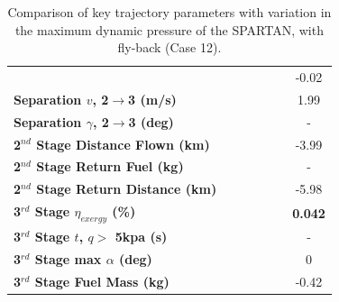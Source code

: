 \begin{table}[ht]
\begin{tabular}{l c c c c c c}
		& \secondthirdSeparationAltqForty
		& \secondthirdSeparationAltqFortyFive
		& \secondthirdSeparationAltqStandard
		& \secondthirdSeparationAltqFiftyFive
		& \secondthirdSeparationAltqSixty
		&-0.02
		\\
		\textbf{Separation $v$, 2$\rightarrow$3 (m/s)}
		& \secondthirdSeparationvqForty
		& \secondthirdSeparationvqFortyFive
		& \secondthirdSeparationvqStandard
		& \secondthirdSeparationvqFiftyFive
		& \secondthirdSeparationvqSixty
		&1.99
		\\
		\textbf{Separation $\gamma$, 2$\rightarrow$3 (deg)}
		& \secondthirdSeparationgammaqForty
		& \secondthirdSeparationgammaqFortyFive
		& \secondthirdSeparationgammaqStandard
		& \secondthirdSeparationgammaqFiftyFive
		& \secondthirdSeparationgammaqSixty
		& -
		\\
	
		\textbf{2$^{nd}$ Stage Distance Flown (km)}
		& \SecondDistqForty
		& \SecondDistqFortyFive
		& \SecondDistqStandard
		& \SecondDistqFiftyFive
		& \SecondDistqSixty
		&-3.99
		\\
		\textbf{2$^{nd}$ Stage Return Fuel (kg)}
		& \returnFuelqForty
		& \returnFuelqFortyFive
		& \returnFuelqStandard
		& \returnFuelqFiftyFive
		& \returnFuelqSixty
		& -
		\\
		\textbf{2$^{nd}$ Stage Return Distance (km)}
		& \returnDistqForty
		& \returnDistqFortyFive
		& \returnDistqStandard
		& \returnDistqFiftyFive
		& \returnDistqSixty
		&-5.98
		\\
		\hline 
		\textbf{3$^{rd}$ Stage $\eta_{exergy}$ (\%)}
		& \textbf{\thirddExergyEffqForty}
		& \textbf{\thirddExergyEffqFortyFive}
		& \textbf{\thirddExergyEffqStandard}
		& \textbf{\thirddExergyEffqFiftyFive}
		& \textbf{\thirddExergyEffqSixty}
		& \textbf{0.042}
		\\
		\textbf{3$^{rd}$ Stage $t$, $q >$ 5kpa (s)}
		& \thirdqOverFiveqForty
		& \thirdqOverFiveqFortyFive
		& \thirdqOverFiveqStandard
		& \thirdqOverFiveqFiftyFive
		& \thirdqOverFiveqSixty
		& -
		\\
		\textbf{3$^{rd}$ Stage max $\alpha$ (deg)}
		& \thirdmaxAoAqForty
		& \thirdmaxAoAqFortyFive
		& \thirdmaxAoAqStandard
		& \thirdmaxAoAqFiftyFive
		& \thirdmaxAoAqSixty
		&0
		\\
		\textbf{3$^{rd}$ Stage Fuel Mass (kg)}
		& \thirdmFuelqForty
		& \thirdmFuelqFortyFive
		& \thirdmFuelqStandard
		& \thirdmFuelqFiftyFive
		& \thirdmFuelqSixty
		&-0.42
		\\
		\hline 
	\end{tabular} 
	\caption{Comparison of key trajectory parameters with variation in the maximum dynamic pressure of the SPARTAN, with fly-back (Case 12).}
	\label{tab:qvarreturn}
\end{table}


